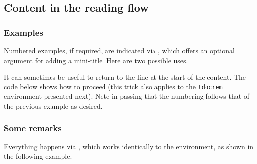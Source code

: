 \subsection{Content in the reading flow}








\subsubsection{Examples}

Numbered examples, if required, are indicated via , which offers an optional argument for adding a mini-title.
Here are two possible uses.






\begin{tdoctip}
    It can sometimes be useful to return to the line at the start of the content. The code below shows how to proceed (this trick also applies to the \verb#tdocrem# environment presented next). Note in passing that the numbering follows that of the previous example as desired.
\end{tdoctip}





\subsubsection{Some remarks}

Everything happens via , which works identically to the  environment, as shown in the following example.

